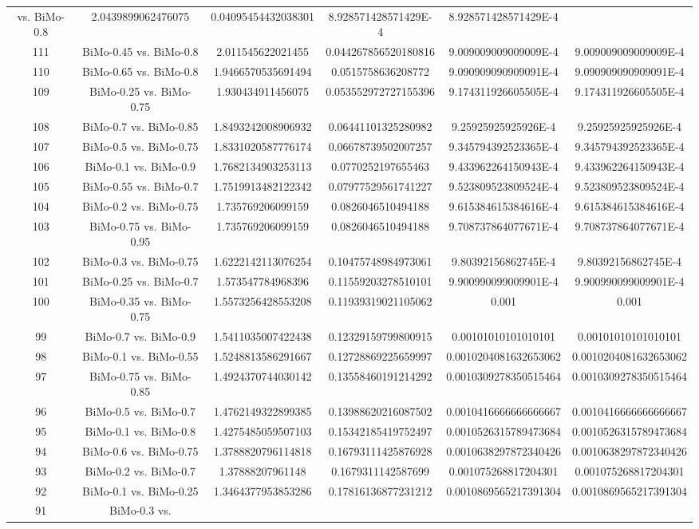 \documentclass[a4paper,10pt]{article}
\begin{document}
\begin{landscape}
\begin{table}[!htp]
\begin{tabular}{cccccc}
vs. BiMo-0.8&2.0439899062476075&0.04095454432038301&8.928571428571429E-4&8.928571428571429E-4\\111&BiMo-0.45 vs. BiMo-0.8&2.011545622021455&0.044267856520180816&9.009009009009009E-4&9.009009009009009E-4\\110&BiMo-0.65 vs. BiMo-0.8&1.9466570535691494&0.0515758636208772&9.090909090909091E-4&9.090909090909091E-4\\109&BiMo-0.25 vs. BiMo-0.75&1.930434911456075&0.053552972727155396&9.174311926605505E-4&9.174311926605505E-4\\108&BiMo-0.7 vs. BiMo-0.85&1.8493242008906932&0.06441101325280982&9.25925925925926E-4&9.25925925925926E-4\\107&BiMo-0.5 vs. BiMo-0.75&1.8331020587776174&0.06678739502007257&9.345794392523365E-4&9.345794392523365E-4\\106&BiMo-0.1 vs. BiMo-0.9&1.7682134903253113&0.0770252197655463&9.433962264150943E-4&9.433962264150943E-4\\105&BiMo-0.55 vs. BiMo-0.7&1.7519913482122342&0.07977529561741227&9.523809523809524E-4&9.523809523809524E-4\\104&BiMo-0.2 vs. BiMo-0.75&1.735769206099159&0.0826046510494188&9.615384615384616E-4&9.615384615384616E-4\\103&BiMo-0.75 vs. BiMo-0.95&1.735769206099159&0.0826046510494188&9.708737864077671E-4&9.708737864077671E-4\\102&BiMo-0.3 vs. BiMo-0.75&1.6222142113076254&0.10475748984973061&9.80392156862745E-4&9.80392156862745E-4\\101&BiMo-0.25 vs. BiMo-0.7&1.573547784968396&0.11559203278510101&9.900990099009901E-4&9.900990099009901E-4\\100&BiMo-0.35 vs. BiMo-0.75&1.5573256428553208&0.11939319021105062&0.001&0.001\\99&BiMo-0.7 vs. BiMo-0.9&1.5411035007422438&0.12329159799800915&0.00101010101010101&0.00101010101010101\\98&BiMo-0.1 vs. BiMo-0.55&1.5248813586291667&0.12728869225659997&0.0010204081632653062&0.0010204081632653062\\97&BiMo-0.75 vs. BiMo-0.85&1.4924370744030142&0.13558460191214292&0.0010309278350515464&0.0010309278350515464\\96&BiMo-0.5 vs. BiMo-0.7&1.4762149322899385&0.13988620216087502&0.0010416666666666667&0.0010416666666666667\\95&BiMo-0.1 vs. BiMo-0.8&1.4275485059507103&0.15342185419752497&0.0010526315789473684&0.0010526315789473684\\94&BiMo-0.6 vs. BiMo-0.75&1.3788820796114818&0.16793111425876928&0.0010638297872340426&0.0010638297872340426\\93&BiMo-0.2 vs. BiMo-0.7&1.37888207961148&0.1679311142587699&0.001075268817204301&0.001075268817204301\\92&BiMo-0.1 vs. BiMo-0.25&1.3464377953853286&0.17816136877231212&0.0010869565217391304&0.0010869565217391304\\91&BiMo-0.3 vs. 
\end{tabular}
\end{table}
\end{landscape}
\end{document}
